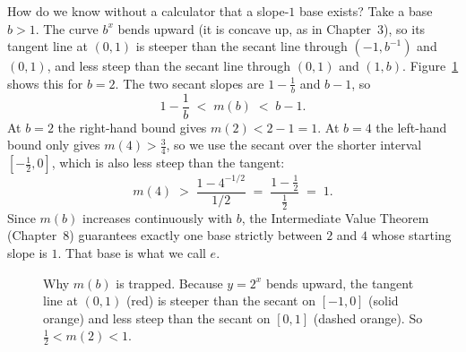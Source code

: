 How do we know without a calculator that a slope-$1$ base exists? Take a base
$b>1$. The curve $b^x$ bends upward (it is concave up, as in Chapter~3), so its
tangent line at $(0,1)$ is steeper than the secant line through $(-1,b^{-1})$
and $(0,1)$, and less steep than the secant line through $(0,1)$ and $(1,b)$.
Figure~\ref{ch12:fig-secant-trap} shows this for $b=2$. The two secant slopes
are $1-\tfrac1b$ and $b-1$, so
\[
   1-\frac{1}{b} \;<\; m(b) \;<\; b-1.
\]
At $b=2$ the right-hand bound gives $m(2) < 2-1 = 1$. At $b=4$ the left-hand
bound only gives $m(4) > \tfrac34$, so we use the secant over the shorter
interval $[-\tfrac12,0]$, which is also less steep than the tangent:
\[
   m(4) \;>\; \frac{1-4^{-1/2}}{1/2} \;=\; \frac{1-\tfrac12}{\tfrac12} \;=\; 1.
\]
Since $m(b)$ increases continuously with $b$, the Intermediate Value Theorem
(Chapter~8) guarantees exactly one base strictly between $2$ and $4$ whose
starting slope is $1$. That base is what we call $e$.

\begin{figure}[htbp]
\centering
{}
\caption{Why $m(b)$ is trapped. Because $y=2^x$ bends upward, the tangent line at
$(0,1)$ (red) is steeper than the secant on $[-1,0]$ (solid orange) and less
steep than the secant on $[0,1]$ (dashed orange). So
$\tfrac12 < m(2) < 1$.}
\label{ch12:fig-secant-trap}
\end{figure}

